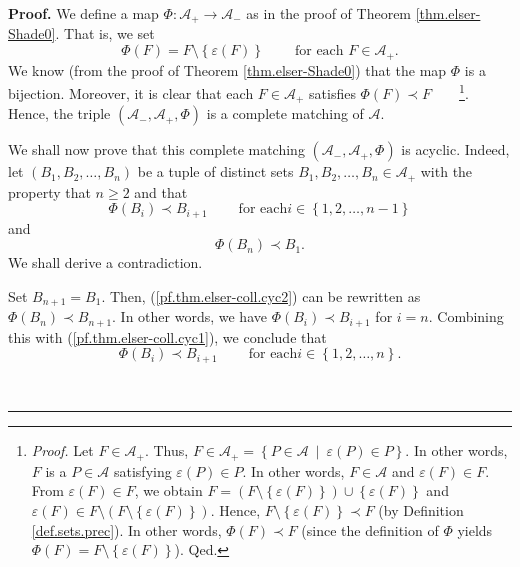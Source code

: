 \documentclass[numbers=enddot,12pt,final,onecolumn]{scrartcl}%
\theoremstyle{definition}
\newenvironment{proof}[1][Proof]{\noindent\textbf{#1.} }{\ \rule{0.5em}{0.5em}}
\renewcommand{\geq}{\geqslant}
\begin{document}
\begin{proof}
We define a map $\Phi:\mathcal{A}_{+}\rightarrow\mathcal{A}_{-}$ as in the
proof of Theorem \ref{thm.elser-Shade0}. That is, we set%
\[
\Phi\left(  F\right)  =F\setminus\left\{  \varepsilon\left(  F\right)
\right\}  \ \ \ \ \ \ \ \ \ \ \text{for each }F\in\mathcal{A}_{+}.
\]
We know (from the proof of Theorem \ref{thm.elser-Shade0}) that the map $\Phi$
is a bijection. Moreover, it is clear that each $F\in\mathcal{A}_{+}$
satisfies $\Phi\left(  F\right)  \prec F$\ \ \ \ \footnote{\textit{Proof.} Let
$F\in\mathcal{A}_{+}$. Thus, $F\in\mathcal{A}_{+}=\left\{  P\in\mathcal{A}%
\ \mid\ \varepsilon\left(  P\right)  \in P\right\}  $. In other words, $F$ is
a $P\in\mathcal{A}$ satisfying $\varepsilon\left(  P\right)  \in P$. In other
words, $F\in\mathcal{A}$ and $\varepsilon\left(  F\right)  \in F$. From
$\varepsilon\left(  F\right)  \in F$, we obtain $F=\left(  F\setminus\left\{
\varepsilon\left(  F\right)  \right\}  \right)  \cup\left\{  \varepsilon
\left(  F\right)  \right\}  $ and $\varepsilon\left(  F\right)  \in
F\setminus\left(  F\setminus\left\{  \varepsilon\left(  F\right)  \right\}
\right)  $. Hence, $F\setminus\left\{  \varepsilon\left(  F\right)  \right\}
\prec F$ (by Definition \ref{def.sets.prec}). In other words, $\Phi\left(
F\right)  \prec F$ (since the definition of $\Phi$ yields $\Phi\left(
F\right)  =F\setminus\left\{  \varepsilon\left(  F\right)  \right\}  $).
Qed.}. Hence, the triple $\left(  \mathcal{A}_{-},\mathcal{A}_{+},\Phi\right)
$ is a complete matching of $\mathcal{A}$.

We shall now prove that this complete matching $\left(  \mathcal{A}%
_{-},\mathcal{A}_{+},\Phi\right)  $ is acyclic. Indeed, let $\left(
B_{1},B_{2},\ldots,B_{n}\right)  $ be a tuple of distinct sets $B_{1}%
,B_{2},\ldots,B_{n}\in\mathcal{A}_{+}$ with the property that $n\geq2$ and
that%
\begin{equation}
\Phi\left(  B_{i}\right)  \prec B_{i+1}\ \ \ \ \ \ \ \ \ \ \text{for each
}i\in\left\{  1,2,\ldots,n-1\right\}  \label{pf.thm.elser-coll.cyc1}%
\end{equation}
and%
\begin{equation}
\Phi\left(  B_{n}\right)  \prec B_{1}. \label{pf.thm.elser-coll.cyc2}%
\end{equation}
We shall derive a contradiction.

Set $B_{n+1}=B_{1}$. Then, (\ref{pf.thm.elser-coll.cyc2}) can be rewritten as
$\Phi\left(  B_{n}\right)  \prec B_{n+1}$. In other words, we have
$\Phi\left(  B_{i}\right)  \prec B_{i+1}$ for $i=n$. Combining this with
(\ref{pf.thm.elser-coll.cyc1}), we conclude that%
\begin{equation}
\Phi\left(  B_{i}\right)  \prec B_{i+1}\ \ \ \ \ \ \ \ \ \ \text{for each
}i\in\left\{  1,2,\ldots,n\right\}  . \label{pf.thm.elser-coll.cyc12}%
\end{equation}



\end{proof}
\end{document}
